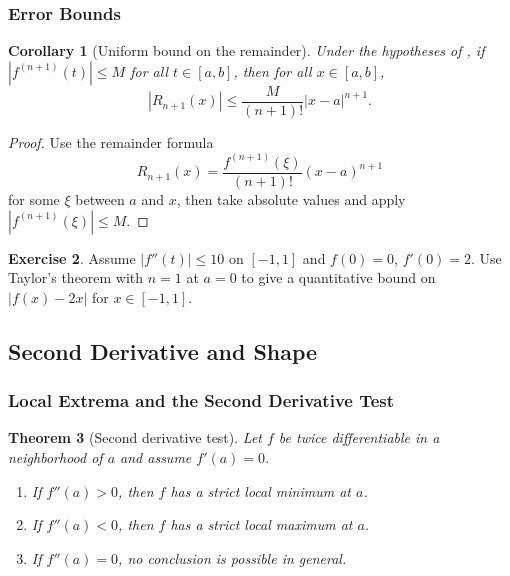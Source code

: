 \documentclass[12pt]{article}
\numberwithin{equation}{section}
\def\abs#1{|#1|}
\DeclarePairedDelimiter{\abs}{\lvert}{\rvert}
\theoremstyle{plain}
\newtheorem{theorem}{Theorem}[section]
\newtheorem{corollary}[theorem]{Corollary}
\theoremstyle{definition}
\newtheorem{exercise}[theorem]{Exercise}
\theoremstyle{remark}
\begin{document}
\subsubsection{Error Bounds}

\begin{corollary}[Uniform bound on the remainder]\label{cor:taylor-bound}
Under the hypotheses of , if $\abs{f^{(n+1)}(t)}\le M$ for all $t\in[a,b]$, then for all $x\in[a,b]$,
\[
\abs{R_{n+1}(x)}\le \frac{M}{(n+1)!}\abs{x-a}^{n+1}.
\]
\end{corollary}

\begin{proof}
Use the remainder formula
\[
R_{n+1}(x)=\frac{f^{(n+1)}(\xi)}{(n+1)!}(x-a)^{n+1}
\]
for some $\xi$ between $a$ and $x$, then take absolute values and apply $\abs{f^{(n+1)}(\xi)}\le M$.
\end{proof}

\begin{exercise}
Assume $\abs{f''(t)}\le 10$ on $[-1,1]$ and $f(0)=0$, $f'(0)=2$.
Use Taylor's theorem with $n=1$ at $a=0$ to give a quantitative bound on $\abs{f(x)-2x}$ for $x\in[-1,1]$.
\end{exercise}

\newpage

\subsection{Second Derivative and Shape}

\subsubsection{Local Extrema and the Second Derivative Test}

\begin{theorem}[Second derivative test]\label{thm:second-derivative}
Let $f$ be twice differentiable in a neighborhood of $a$ and assume $f'(a)=0$.
\begin{enumerate}[label=(\alph*)]
\item If $f''(a)>0$, then $f$ has a strict local minimum at $a$.
\item If $f''(a)<0$, then $f$ has a strict local maximum at $a$.
\item If $f''(a)=0$, no conclusion is possible in general.
\end{enumerate}
\end{theorem}
\end{document}
